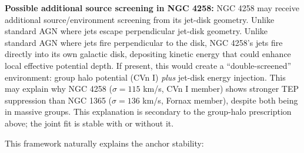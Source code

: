 \documentclass[
]{article}
\begin{document}
\textbf{Possible additional source screening in NGC 4258:} NGC 4258 may
receive additional source/environment screening from its jet-disk
geometry. Unlike standard AGN where jets escape perpendicular jet-disk
geometry. Unlike standard AGN where jets fire perpendicular to the disk,
NGC 4258's jets fire directly into its own galactic disk, depositing
kinetic energy that could enhance local effective potential depth. If
present, this would create a ``double-screened'' environment: group halo
potential (CVn I) \emph{plus} jet-disk energy injection. This may
explain why NGC 4258 (\(\sigma=115\) km/s, CVn I member) shows stronger
TEP suppression than NGC 1365 (\(\sigma=136\) km/s, Fornax member),
despite both being in massive groups. This explanation is secondary to
the group-halo prescription above; the joint fit is stable with or
without it.

This framework naturally explains the anchor stability:
\end{document}
